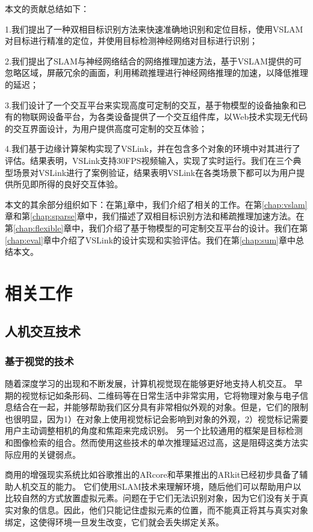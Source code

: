 本文的贡献总结如下：

1.我们提出了一种双相目标识别方法来快速准确地识别和定位目标，使用VSLAM对目标进行精准的定位，并使用目标检测神经网络对目标进行识别；

2.我们提出了SLAM与神经网络结合的网络推理加速方法，基于VSLAM提供的可忽略区域，屏蔽冗余的画面，利用稀疏推理进行神经网络推理的加速，以降低推理的延迟；

3.我们设计了一个交互平台来实现高度可定制的交互，基于物模型的设备抽象和已有的物联网设备平台，为各类设备提供了一个交互组件库，以Web技术实现无代码的交互界面设计，为用户提供高度可定制的交互体验；

4.我们基于边缘计算架构实现了VSLink，并在包含多个对象的环境中对其进行了评估。结果表明，VSLink支持30FPS视频输入，实现了实时运行。我们在三个典型场景对VSLink进行了案例验证，结果表明VSLink在各类场景下都可以为用户提供所见即所得的良好交互体验。

本文的其余部分组织如下：在第\ref{chap:related}章中，我们介绍了相关的工作。在第\ref{chap:vslam}章和第\ref{chap:sparse}章中，我们描述了双相目标识别方法和稀疏推理加速方法。在第\ref{chap:flexible}章中，我们介绍了基于物模型的可定制交互平台的设计。我们在第\ref{chap:eval}章中介绍了VSLink的设计实现和实验评估。我们在第\ref{chap:sum}章中总结本文。



\chapter{相关工作}
\label{chap:related}
\section{人机交互技术}
\subsection{基于视觉的技术}
随着深度学习的出现和不断发展，计算机视觉现在能够更好地支持人机交互。
早期的视觉标记\cite{wang2010design,olson2011apriltag}如条形码、二维码等在日常生活中非常实用，它将物理对象与电子信息结合在一起，并能够帮助我们区分具有非常相似外观的对象。但是，它们的限制也很明显，因为1）在对象上使用视觉标记会影响到对象的外观，2）视觉标记需要用户主动调整相机的角度和焦距来完成识别。
另一个比较通用的框架是目标检测\cite{ren2015faster,redmon2018yolov3,qin2019thundernet}和图像检索\cite{philbin2008lost,zheng2017sift}的组合。然而使用这些技术的单次推理延迟过高，这是阻碍这类方法实际应用的关键弱点。

商用的增强现实系统比如谷歌推出的ARcore\cite{arcore}和苹果推出的ARkit\cite{arkit}已经初步具备了辅助人机交互的能力。
它们使用SLAM技术来理解环境，随后他们可以帮助用户以比较自然的方式放置虚拟元素。问题在于它们无法识别对象，因为它们没有关于真实对象的信息。因此，他们只能记住虚拟元素的位置，而不能真正将其与真实对象绑定，这使得环境一旦发生改变，它们就会丢失绑定关系。

